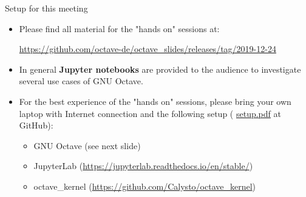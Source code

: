 \begin{frame}{Setup for this meeting}
\begin{itemize}
\itemsep1em
\item
Please find all material for the "hands on" sessions at:

{\color{DarkBlue}
\url{https://github.com/octave-de/octave_slides/releases/tag/2019-12-24}
}

\item
In general \textbf{Jupyter notebooks} are provided to the audience
to investigate several use cases of GNU Octave.

\item
For the best experience of the "hands on" sessions,
please bring your own laptop with Internet connection and the following setup
({\color{red}
\href{https://github.com/octave-de/octave_slides/releases/tag/2019-12-24}{setup.pdf}} at GitHub):

\begin{itemize}
\itemsep1em
\item
GNU Octave (see next slide)
\item
JupyterLab
({\color{DarkBlue}\url{https://jupyterlab.readthedocs.io/en/stable/}})
\item
octave\_kernel
({\color{DarkBlue}\url{https://github.com/Calysto/octave_kernel}})
\end{itemize}
\end{itemize}
\end{frame}


